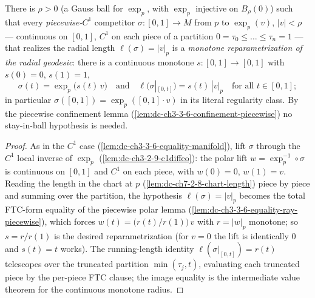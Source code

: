 \begin{lemma}
  \label{lem:dc-ch3-3-6-equality-manifold-piecewise}
  \leanok
  There is $\rho>0$ (a Gauss ball for $\exp_p$, with $\exp_p$ injective on
  $B_\rho(0)$) such that every \emph{piecewise-$C^1$} competitor
  $\sigma:[0,1]\to M$ from $p$ to $\exp_p(v)$, $|v|<\rho$ — continuous on
  $[0,1]$, $C^1$ on each piece of a partition $0=\tau_0\le\dots\le\tau_n=1$ —
  that realizes the radial length $\ell(\sigma)=|v|_p$ is a \emph{monotone
  reparametrization of the radial geodesic}: there is a continuous monotone
  $s:[0,1]\to[0,1]$ with $s(0)=0$, $s(1)=1$,
  $$\sigma(t)=\exp_p\big(s(t)\,v\big)\quad\text{and}\quad
    \ell\big(\sigma|_{[0,t]}\big)=s(t)\,|v|_p\quad\text{for all }t\in[0,1];$$
  in particular $\sigma([0,1])=\exp_p([0,1]\cdot v)$ in its literal regularity
  class. By the piecewise
  confinement lemma (\cref{lem:dc-ch3-3-6-confinement-piecewise}) no
  stay-in-ball hypothesis is needed.
\end{lemma}
\begin{proof}
  \sketch
  \leanok
  As in the $C^1$ case (\cref{lem:dc-ch3-3-6-equality-manifold}), lift
  $\sigma$ through the $C^1$ local inverse of $\exp_p$
  (\cref{lem:dc-ch3-2-9-c1diffeo}): the polar lift $w=\exp_p^{-1}\circ\sigma$
  is continuous on $[0,1]$ and $C^1$ on each piece, with $w(0)=0$,
  $w(1)=v$. Reading the length in the chart at $p$
  (\cref{lem:dc-ch7-2-8-chart-length}) piece by piece and summing over the
  partition, the hypothesis $\ell(\sigma)=|v|_p$ becomes the total FTC-form
  equality of the piecewise polar lemma
  (\cref{lem:dc-ch3-3-6-equality-ray-piecewise}), which forces
  $w(t)=\bigl(r(t)/r(1)\bigr)\,v$ with $r=|w|_p$ monotone; so $s=r/r(1)$ is
  the desired reparametrization (for $v=0$ the lift is identically $0$ and
  $s(t)=t$ works). The running-length identity
  $\ell(\sigma|_{[0,t]})=r(t)$ telescopes over the truncated partition
  $\min(\tau_j,t)$, evaluating each truncated piece by the per-piece FTC
  clause; the image equality is the intermediate value theorem for the
  continuous monotone radius.
\end{proof}


